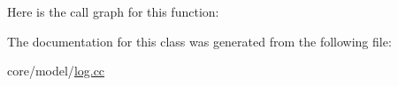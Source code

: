 Here is the call graph for this function\+:




The documentation for this class was generated from the following file\+:\begin{DoxyCompactItemize}
\item 
core/model/\hyperlink{log_8cc}{log.\+cc}\end{DoxyCompactItemize}
